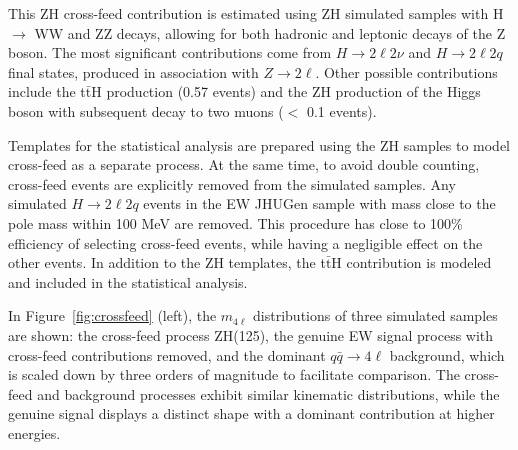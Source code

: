This ZH cross-feed contribution is estimated using \onshell ZH simulated samples with H $\to$ WW and ZZ decays, allowing for both hadronic and leptonic decays of the Z boson. The most significant contributions come from $H \to 2\ell 2\nu$ and $H \to 2\ell 2q$ final states, produced in association with $Z \to 2\ell$. Other possible contributions include the \onshell t$\bar{\text{t}}$H production (0.57 events) and the ZH production of the Higgs boson with subsequent decay to two muons ($<$ 0.1 events). 

Templates for the statistical analysis are prepared using the \onshell ZH samples to model cross-feed
as a separate \onshell process. 
At the same time, to avoid double counting, \onshell cross-feed events are explicitly removed from the \offshell simulated samples.
Any simulated $H\to 2\ell 2q$ events in the \offshell EW JHUGen sample with mass close 
to the \Hboson pole mass within 100 MeV are removed. This procedure has close to 100\%
efficiency of selecting \onshell cross-feed events, while having a negligible effect on the other events. In addition to the ZH templates, the t$\bar{\text{t}}$H contribution is modeled and included in the statistical analysis. 

In Figure~\ref{fig:crossfeed} (left), the $m_{4\ell}$ distributions of three simulated samples are shown: the \onshell cross-feed process ZH(125), the genuine \offshell EW signal process with cross-feed contributions removed, and the dominant $q\bar{q} \to 4\ell$ background, which is scaled down by three orders of magnitude to facilitate comparison. The cross-feed and background processes exhibit similar kinematic distributions, while the genuine \offshell signal displays a distinct shape with a dominant contribution at higher energies.

